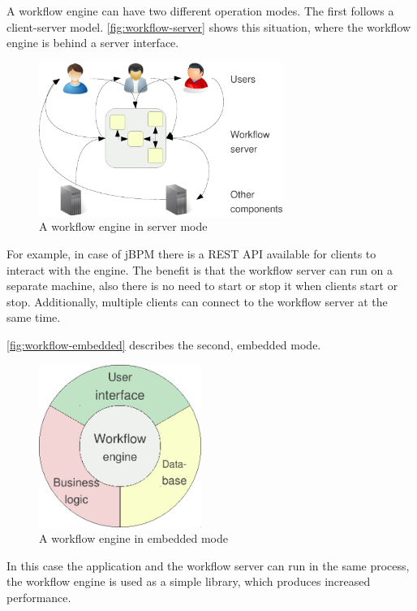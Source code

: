 
A workflow engine can have two different operation modes. The first follows a
client-server model. \autoref{fig:workflow-server} shows this situation,
where the workflow engine is behind a server interface.

\begin{figure}[H]
\centering
\includegraphics[width=300px,keepaspectratio]{workflow-server.pdf}
\caption{A workflow engine in server mode}
\label{fig:workflow-server}
\end{figure}

For example, in case of jBPM there is a REST API available for clients to
interact with the engine. The benefit is that the workflow server can run on a
separate machine, also there is no need to start or stop it when clients start or stop.
Additionally, multiple clients can connect to the workflow server at the same
time.

\autoref{fig:workflow-embedded} describes the second, embedded mode.

\begin{figure}[H]
\centering
\includegraphics[width=200px,keepaspectratio]{workflow-embedded.pdf}
\caption{A workflow engine in embedded mode}
\label{fig:workflow-embedded}
\end{figure}

In this case the application and the workflow server can run in the same
process, the workflow engine is used as a simple library, which produces
increased performance.

